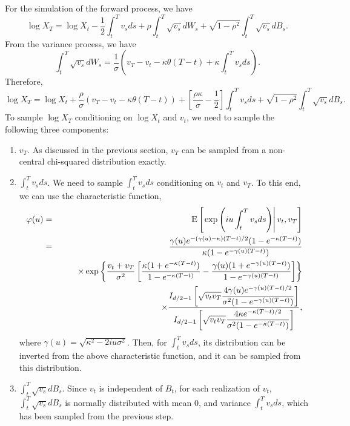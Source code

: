 \documentclass[12pt]{article}
\begin{document}
    For the simulation of the forward process, we have
    \begin{equation}
      \log X_T = \log X_t - \frac{1}{2}\int_t^Tv_sds + \rho\int_t^T\sqrt{v_s}dW_s
                  + \sqrt{1-\rho^2}\int_t^T\sqrt{v_s}dB_s.
    \end{equation}
    From the variance process, we have
    \begin{equation}
      \int_t^T\sqrt{v_s}dW_s = \frac{1}{\sigma}\left(v_T-v_t-\kappa\theta(T-t)+\kappa\int_t^Tv_sds\right).
    \end{equation}
    Therefore,
    \begin{equation}
      \log X_T = \log X_t + \frac{\rho}{\sigma}\left(v_T-v_t-\kappa\theta(T-t) \right)
                    + \left[\frac{\rho\kappa}{\sigma}- \frac{1}{2}\right]\int_t^Tv_sds
                    + \sqrt{1-\rho^2}\int_t^T\sqrt{v_s}dB_s.
      \label{logStock}
    \end{equation}
    To sample $\log X_T$ conditioning on $\log X_t$ and $v_t$, we need to sample the following three components:
    \begin{enumerate}[noitemsep]
      \item $v_T$. As discussed in the previous section, $v_T$ can be sampled from a non-central chi-squared distribution exactly.
      \item $\int_t^Tv_sds$. We need to sample $\int_t^Tv_sds$ conditioning on $v_t$ and $v_T$. To this end, we can use the characteristic function,
        \begin{eqnarray}
          \varphi(u) &=& {\rm E}\left[\left. \exp\left(iu\int_t^Tv_sds\right) \right|v_t,v_T\right] \nonumber\\
                     &=& \frac{\gamma(u)e^{-(\gamma(u)-\kappa)(T-t)/2}(1-e^{-\kappa(T-t)})}{\kappa(1-e^{-\gamma(u)(T-t)})}\nonumber\\
                     && \quad\quad\times
                          \exp\left\{\frac{v_t+v_T}{\sigma^2}\left[\frac{\kappa(1+e^{-\kappa(T-t)})}{1-e^{-\kappa(T-t)}}
                                                  -\frac{\gamma(u)(1+e^{-\gamma(u)(T-t)})}{1-e^{-\gamma(u)(T-t)}}\right]\right\} \nonumber\\
                    && \quad\quad\times
                    \frac{\displaystyle I_{d/2-1}\left[\sqrt{v_tv_T}\frac{4\gamma(u)e^{-\gamma(u)(T-t)/2}}{\sigma^2(1-e^{-\gamma(u)(T-t)})}\right]}
                         {\displaystyle I_{d/2-1}\left[\sqrt{v_tv_T}\frac{4\kappa e^{-\kappa(T-t)/2}}{\sigma^2(1-e^{-\kappa(T-t)})}\right]},
        \end{eqnarray}
        where $\gamma(u)=\sqrt{\kappa^2-2iu\sigma^2}$. Then, for $\int_t^Tv_sds$, its distribution can be inverted from the
        above characteristic function, and it can be sampled from this distribution.
      \item $\int_t^T\sqrt{v_s}dB_s$. Since $v_t$ is independent of $B_t$, for each realization of $v_t$, $\int_t^T\sqrt{v_s}dB_s$ is normally distributed
                with mean 0, and variance $\int_t^Tv_sds$, which has been sampled from the previous step.
    \end{enumerate}
\end{document}
